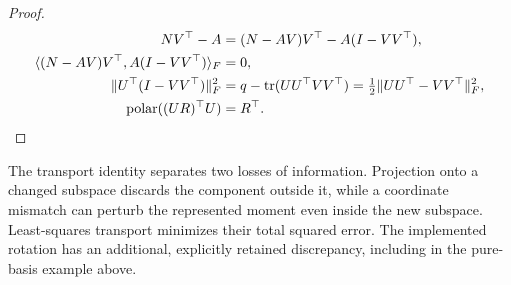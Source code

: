 \begin{proof}
\begin{align}
 NV^\top-A&=(N-AV)V^\top-A(I-VV^\top),\\
 \langle(N-AV)V^\top,A(I-VV^\top)\rangle_F&=0,\\
 \|U^\top(I-VV^\top)\|_F^2
 &=q-\operatorname{tr}(UU^\top VV^\top)=\tfrac12\|UU^\top-VV^\top\|_F^2,\\
 \operatorname{polar}((UR)^\top U)&=R^\top.
\end{align}
\end{proof}
The transport identity separates two losses of information. Projection onto a
changed subspace discards the component outside it, while a coordinate mismatch
can perturb the represented moment even inside the new subspace. Least-squares
transport minimizes their total squared error. The implemented rotation has
an additional, explicitly retained discrepancy, including in the pure-basis
example above.

